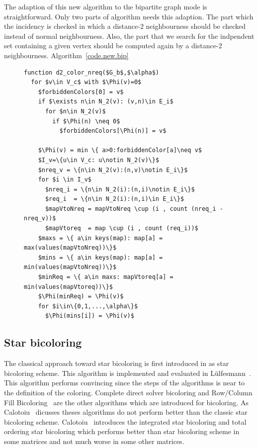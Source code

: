 \documentclass[12pt, oneside]{book}
\newcommand{\coderef}[1]{Algorithm~\protect\ref{#1}}
\begin{document}
The adaption of this new algorithm to the bipartite graph mode is straightforward.
Only two parts of algorithm needs this adaption. The part which the incidency is checked 
in which a distance-$2$ neighbourness should be checked instead of normal neighbourness.
Also, the part that we search for the indpendent set containing a given vertex should 
be computed again by a distance-$2$ neighbourness. 
\coderef{code.new.bip}
\begin{figure}
\begin{lstlisting}[caption=New coloring heuristc rewritten in the bipartite graph model,label=code.new.bip,mathescape]
function d2_color_nreq($G_b$,$\alpha$)
  for $v\in V_c$ with $\Phi(v)=0$
    $forbiddenColors[0] = v$
    if $\exists n\in N_2(v): (v,n)\in E_i$ 
      for $n\in N_2(v)$
        if $\Phi(n) \neq 0$
          $forbiddenColors[\Phi(n)] = v$

    $\Phi(v) = min \{ a>0:forbiddenColor[a]\neq v$
    $I_v=\{u\in V_c: u\notin N_2(v)\}$
    $nreq_v = \{n\in N_2(v):(n,v)\notin E_i\}$
    for $i \in I_v$
      $nreq_i = \{n\in N_2(i):(n,i)\notin E_i\}$
      $req_i  = \{n\in N_2(i):(n,i)\in E_i\}$ 
      $mapVtoNreq = mapVtoNreq \cup (i , count (nreq_i - nreq_v))$
      $mapVtoreq  = map \cup (i , count (req_i))$
    $maxs = \{ a\in keys(map): map[a] = max(values(mapVtoNreq))\}$
    $mins = \{ a\in keys(map): map[a] = min(values(mapVtoNreq))\}$
    $minReq = \{ a\in maxs: mapVtoreq[a] = min(values(mapVtoreq))\}$
    $\Phi(minReq) = \Phi(v)$
    for $i\in\{0,1,...,\alpha\}$
      $\Phi(mins[i]) = \Phi(v)$
\end{lstlisting}
\end{figure}

\subsection{Star bicoloring}
\label{s.heuristic.starbicoloring}
The classical approach toward star bicoloring is first introduced in 
\cite{Gebremedhin05whatcolor} as star bicoloring scheme.
This algorithm is implemented and evaluated in
Lülfesmann~\cite{LulfesmannMaster}. This algorithm performs convincing
since the steps of the algorithms is near to the definition of the coloring.
Complete direct solver bicoloring and Row/Column Fill Bicoloring~\cite{Hossain95computinga}
are the other algorithms which are introduced for bicoloring.
As Calotoiu~\cite{CalotoiuMaster} dicusses theses algorithms do not perform
better than the classic star bicoloring scheme.
Calotoiu~\cite{CalotoiuMaster} introduces the integrated star bicoloring 
and total ordering star bicoloring which performs better than 
star bicoloring scheme in some matrices and not much worse in some other
matrices.
\end{document}
